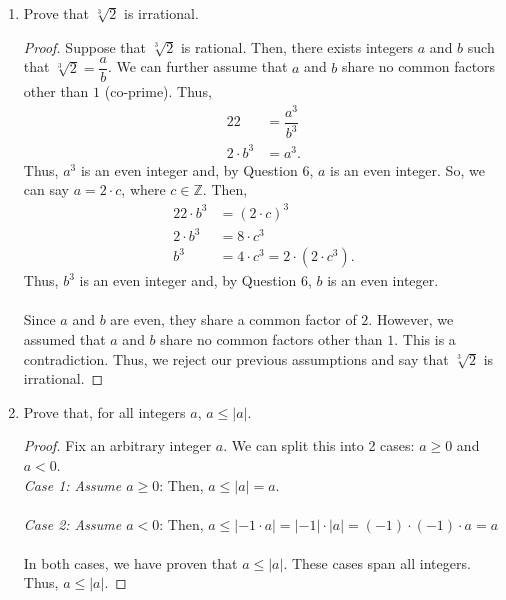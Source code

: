 \documentclass{article}
\begin{document}
\begin{enumerate}
	\item Prove that $\sqrt[3]{2}$ is irrational.
            \begin{proof}
                Suppose that $\sqrt[3]{2}$ is rational. Then, there exists integers $a$ and $b$ such that $\sqrt[3]{2} = \dfrac{a}{b}$. We can further assume that $a$ and $b$ share no common factors other than $1$ (co-prime). Thus,
                \begin{alignat*}{2}
                    2 &= \dfrac{a^3}{b^3} \\
                    2\cdot b^3 &= a^3.
                \end{alignat*}
                Thus, $a^3$ is an even integer and, by Question 6, $a$ is an even integer. So, we can say $a = 2 \cdot c$, where $c\in \mathbb{Z}$. Then,
                \begin{alignat*}{2}
                    2\cdot b^3 &= (2\cdot c)^3 \\
                    2\cdot b^3 &= 8 \cdot c^3 \\
                    b^3 &= 4 \cdot c^3 = 2 \cdot(2\cdot c^3).
                \end{alignat*}
                Thus, $b^3$ is an even integer and, by Question 6, $b$ is an even integer.\\\\ Since $a$ and $b$ are even, they share a common factor of $2$. However, we assumed that $a$ and $b$ share no common factors other than $1$. This is a contradiction. Thus, we reject our previous assumptions and say that $\sqrt[3]{2}$ is irrational.
            \end{proof}

	\item Prove that, for all integers $a$, $a \le |a|$.
            \begin{proof}
                Fix an arbitrary integer $a$. We can split this into 2 cases: $a \ge 0$ and $a < 0$. \\

                \emph{Case 1: Assume $a \ge 0$}: Then, $a \le |a| = a$. \\\\
                \emph{Case 2: Assume $a < 0$}: Then, $a \le |\minus 1\cdot a| = |\minus1| \cdot |a| = (\minus 1)\cdot (\minus 1) \cdot a = a$ \\\\
                In both cases, we have proven that $a \le |a|$. These cases span all integers. Thus, $a \le |a|$.
            \end{proof}


\end{enumerate}
\end{document}
